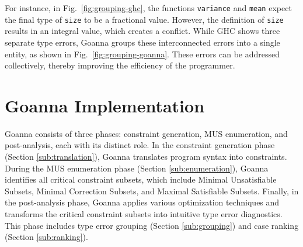 \documentclass[pdflatex,lineno,sn-nature,Numbered]{sn-jnl}%
\begin{document}
    For instance, in Fig.~\ref{fig:grouping-ghc}, the functions \texttt{variance} and \texttt{mean} expect the final type of \texttt{size} to be a fractional value. However, the definition of \texttt{size} results in an integral value, which creates a conflict. While GHC shows three separate type errors, Goanna groups these interconnected errors into a single entity, as shown in Fig.~\ref{fig:grouping-goanna}. These errors can be addressed collectively, thereby improving the efficiency of the programmer.

    

    \section{Goanna Implementation} \label{sec:implementation}
Goanna consists of three phases: constraint generation, MUS enumeration, and post-analysis, each with its distinct role. In the constraint generation phase (Section \ref{sub:translation}), Goanna translates program syntax into constraints. During the MUS enumeration phase (Section \ref{sub:enumeration}), Goanna identifies all critical constraint subsets, which include Minimal Unsatisfiable Subsets, Minimal Correction Subsets, and Maximal Satisfiable Subsets. Finally, in the post-analysis phase, Goanna applies various optimization techniques and transforms the critical constraint subsets into intuitive type error diagnostics. This phase includes type error grouping (Section \ref{sub:grouping}) and case ranking (Section \ref{sub:ranking}).
\end{document}
